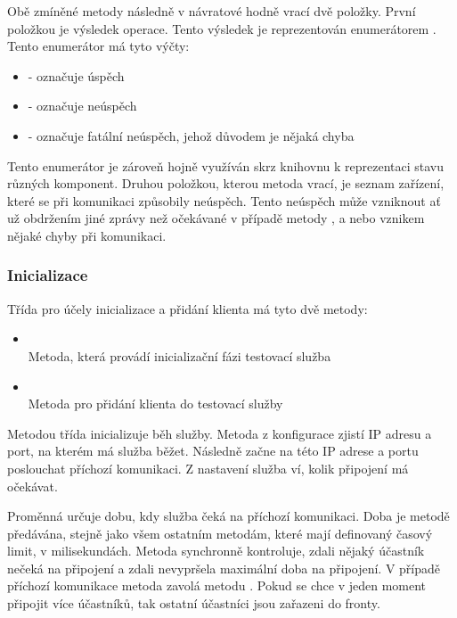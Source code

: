 Obě zmíněné metody následně v návratové hodně vrací dvě položky. První položkou je výsledek operace. Tento výsledek je reprezentován enumerátorem . Tento enumerátor má tyto výčty:

\begin{itemize}
    \item {} - označuje úspěch
    \item {} - označuje neúspěch
    \item {} - označuje fatální neúspěch, jehož důvodem je nějaká chyba
\end{itemize}

Tento enumerátor je zároveň hojně využíván skrz knihovnu k reprezentaci stavu různých komponent. Druhou položkou, kterou metoda vrací, je seznam zařízení, které se při komunikaci způsobily neúspěch. Tento neúspěch může vzniknout ať už obdržením jiné zprávy než očekávané v případě metody , a nebo vznikem nějaké chyby při komunikaci.

\subsubsection{Inicializace}

Třída  pro účely inicializace a přidání klienta má tyto dvě metody:

\begin{itemize}
    \item {} \\
    Metoda, která provádí inicializační fázi testovací služba
    \item {}\\
    Metoda pro přidání klienta do testovací služby
\end{itemize}

Metodou  třída inicializuje běh služby. Metoda z konfigurace zjistí IP adresu a port, na kterém má služba běžet. Následně začne na této IP adrese a portu poslouchat příchozí komunikaci. Z nastavení služba ví, kolik připojení má očekávat. 

Proměnná  určuje dobu, kdy služba čeká na příchozí komunikaci. Doba je metodě předávána, stejně jako všem ostatním metodám, které mají definovaný časový limit, v milisekundách. Metoda synchronně kontroluje, zdali nějaký účastník nečeká na připojení a zdali nevypršela maximální doba na připojení. V případě příchozí komunikace metoda zavolá metodu . Pokud se chce v jeden moment připojit více účastníků, tak ostatní účastníci jsou zařazeni do fronty.

